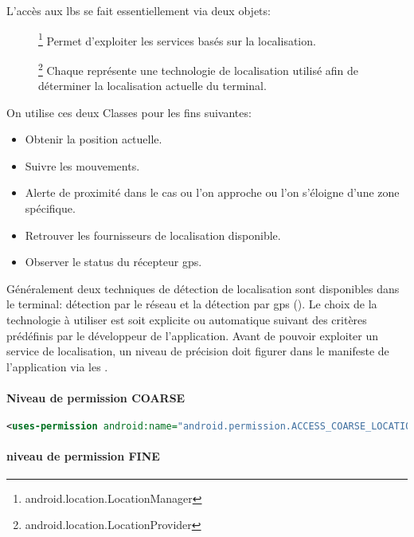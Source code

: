 L'accès aux \gls{lbs} se fait essentiellement via deux objets:
\begin{description}
\item []\footnote{android.location.LocationManager} Permet d'exploiter les services basés sur la localisation.
\item []\footnote{android.location.LocationProvider} Chaque  représente une technologie de localisation utilisé afin de déterminer la localisation actuelle du terminal.

\end{description}
On utilise ces deux Classes pour les fins suivantes:
\begin{itemize}
\item Obtenir la position actuelle.
\item Suivre les mouvements.
\item Alerte de proximité dans le cas ou l'on approche ou l'on s’éloigne d'une zone spécifique.
\item Retrouver les fournisseurs de localisation disponible.
\item Observer le status du récepteur \gls{gps}.
\end{itemize}

Généralement deux techniques de détection de localisation sont disponibles dans le terminal: détection par le réseau  et la détection par \gls{gps} (). Le choix de la technologie à utiliser est soit explicite ou automatique suivant des critères prédéfinis par le développeur de l'application. Avant de pouvoir exploiter un service de localisation, un niveau de précision doit figurer dans le manifeste de l'application via les  .

\paragraph{Niveau de permission \textbf{COARSE} } %
\label{par:coarse}

\begin{lstlisting}[language=xml, caption=Permission pour la localisation par le réseau.]
<uses-permission android:name="android.permission.ACCESS_COARSE_LOCATION"/>
\end{lstlisting}

\paragraph{niveau de permission \textbf{FINE} } %
\label{par:fine}

